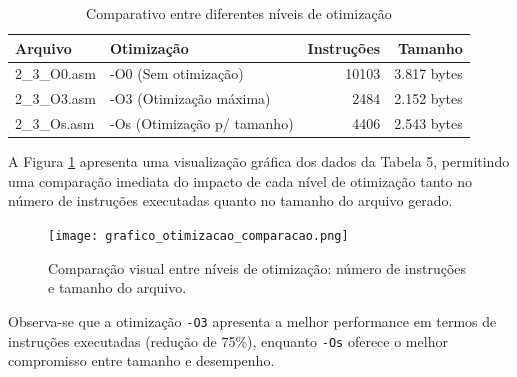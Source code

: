 \documentclass[12pt,a4paper]{article}
\begin{document}
\begin{table}[h!]
    \centering
    \small
    \begin{tabular}{|l|l|r|r|}
        \hline
        \textbf{Arquivo} & \textbf{Otimização} & \textbf{Instruções} & \textbf{Tamanho} \\
        \hline
        2\_3\_O0.asm & -O0 (Sem otimização) & 10103 & 3.817 bytes \\
        2\_3\_O3.asm & -O3 (Otimização máxima) & 2484 & 2.152 bytes \\
        2\_3\_Os.asm & -Os (Otimização p/ tamanho) & 4406 & 2.543 bytes \\
        \hline
    \end{tabular}
    \caption{Comparativo entre diferentes níveis de otimização}
\end{table}

A Figura \ref{fig:otimizacao_comparacao} apresenta uma visualização gráfica dos dados da Tabela 5, permitindo uma comparação imediata do impacto de cada nível de otimização tanto no número de instruções executadas quanto no tamanho do arquivo gerado.

\begin{figure}[H]
\centering
\texttt{[image: grafico\_otimizacao\_comparacao.png]}
\caption{Comparação visual entre níveis de otimização: número de instruções e tamanho do arquivo.}
\label{fig:otimizacao_comparacao}
\end{figure}

Observa-se que a otimização \texttt{-O3} apresenta a melhor performance em termos de instruções executadas (redução de 75\%), enquanto \texttt{-Os} oferece o melhor compromisso entre tamanho e desempenho.
\end{document}
